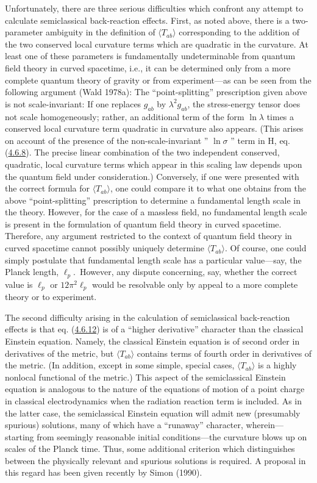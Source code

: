 \documentclass[11pt,a4paper]{article}
\begin{document}
Unfortunately, there are three serious difficulties which confront any attempt to calculate semiclassical back-reaction effects. First, as noted above, there is a two-parameter ambiguity in the definition of \(\langle T_{ab} \rangle\) corresponding to the addition of the two conserved\hypertarget{source-112}{} local curvature terms which are quadratic in the curvature. At least one of these parameters is fundamentally undeterminable from quantum field theory in curved spacetime, i.e., it can be determined only from a more complete quantum theory of gravity or from experiment---as can be seen from the following argument (Wald 1978a): The ``point-splitting'' prescription given above is not scale-invariant: If one replaces \(g_{ab}\) by \(\lambda^2 g_{ab}\), the stress-energy tensor does not scale homogeneously; rather, an additional term of the form \(\ln\lambda\) times a conserved local curvature term quadratic in curvature also appears. (This arises on account of the presence of the non-scale-invariant '' \(\ln\sigma\) '' term in H, eq. (\hyperref[eq:4.6.8]{4.6.8}). The precise linear combination of the two independent conserved, quadratic, local curvature terms which appear in this scaling law depends upon the quantum field under consideration.) Conversely, if one were presented with the correct formula for \(\langle T_{ab}\rangle\), one could compare it to what one obtains from the above ``point-splitting'' prescription to determine a fundamental length scale in the theory. However, for the case of a massless field, no fundamental length scale is present in the formulation of quantum field theory in curved spacetime. Therefore, any argument restricted to the context of quantum field theory in curved spacetime cannot possibly uniquely determine \(\langle T_{ab}\rangle\). Of course, one could simply postulate that fundamental length scale has a particular value---say, the Planck length, \(\ell_p\).~However, any dispute concerning, say, whether the correct value is \(\ell_p\) or \(12\pi^2\ell_p\) would be resolvable only by appeal to a more complete theory or to experiment.

The second difficulty arising in the calculation of semiclassical back-reaction effects is that eq. (\hyperref[eq:4.6.12]{4.6.12}) is of a ``higher derivative'' character than the classical Einstein equation. Namely, the classical Einstein equation is of second order in derivatives of the metric, but \(\langle T_{ab} \rangle\) contains terms of fourth order in derivatives of the metric. (In addition, except in some simple, special cases, \(\langle T_{ab} \rangle\) is a highly nonlocal functional of the metric.) This aspect of the semiclassical Einstein equation is analogous to the nature of the equations of motion of a point charge in classical electrodynamics when the radiation reaction term is included. As in the latter case, the semiclassical Einstein equation will admit new (presumably spurious) solutions, many of which have a ``runaway'' character, wherein---starting from seemingly reasonable initial conditions---the curvature blows up on scales of the Planck time. Thus, some additional criterion which distinguishes between the physically relevant and spurious\hypertarget{source-113}{} solutions is required. A proposal in this regard has been given recently by Simon (1990).
\end{document}
